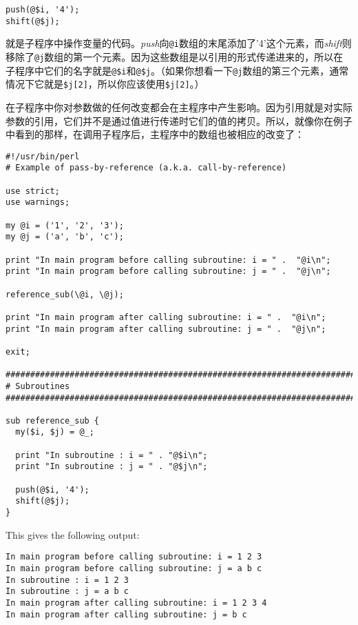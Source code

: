 \begin{lstlisting}
push(@$i, '4');
shift(@$j);
\end{lstlisting}

就是子程序中操作变量的代码。\textit{push}向\verb|@i|数组的末尾添加了'4'这个元素，而\textit{shift}则移除了\verb|@j|数组的第一个元素。因为这些数组是以引用的形式传递进来的，所以在子程序中它们的名字就是\verb|@$i|和\verb|@$j|。（如果你想看一下\verb|@j|数组的第三个元素，通常情况下它就是\verb|$j[2]|，所以你应该使用\verb|$j[2]|。）

在子程序中你对参数做的任何改变都会在主程序中产生影响。因为引用就是对实际参数的引用，它们并不是通过值进行传递时它们的值的拷贝。所以，就像你在例子中看到的那样，在调用子程序后，主程序中的数组也被相应的改变了：

\begin{lstlisting}
#!/usr/bin/perl
# Example of pass-by-reference (a.k.a. call-by-reference)

use strict;
use warnings;

my @i = ('1', '2', '3');
my @j = ('a', 'b', 'c');

print "In main program before calling subroutine: i = " .  "@i\n";
print "In main program before calling subroutine: j = " .  "@j\n";

reference_sub(\@i, \@j);

print "In main program after calling subroutine: i = " .  "@i\n";
print "In main program after calling subroutine: j = " .  "@j\n";

exit;

################################################################################
# Subroutines
################################################################################

sub reference_sub {
  my($i, $j) = @_;

  print "In subroutine : i = " . "@$i\n";
  print "In subroutine : j = " . "@$j\n";

  push(@$i, '4');
  shift(@$j);
}
\end{lstlisting}

This gives the following output:

\begin{lstlisting}
In main program before calling subroutine: i = 1 2 3
In main program before calling subroutine: j = a b c
In subroutine : i = 1 2 3
In subroutine : j = a b c
In main program after calling subroutine: i = 1 2 3 4
In main program after calling subroutine: j = b c
\end{lstlisting}

